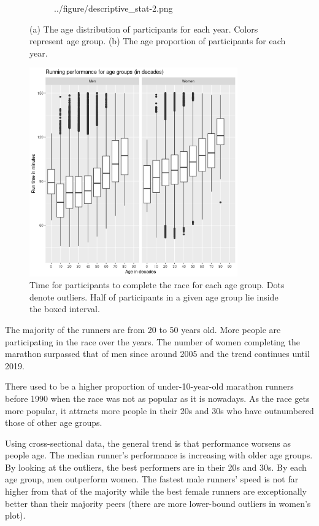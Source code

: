 \documentclass[12pt]{article}
\begin{document}
\begin{figure}
\begin{subfigure}{0.49\textwidth}
		{../figure/descriptive_stat-2.png}
		\caption{}
		\label{age-dist-2}
	\end{subfigure}
	\caption{
		(a) The age distribution of participants for each year.
		Colors represent age group.
		(b) The age proportion of participants for each year.
	}
	\label{age-dist}
\end{figure}

\begin{figure}[ht]
	\centering
	\includegraphics[width = 0.8\textwidth]
	{../figure/boxplot_runtime_age-1.png}
	\caption{
		Time for participants to complete the race for each age group.
		Dots denote outliers. Half of participants in a given age group
		lie inside the boxed interval.
	}
	\label{box-plot}
\end{figure}

The majority of the runners are from 20 to 50 years old.
More people are participating in the race over the years.
The number of women completing the marathon surpassed that of men since
around 2005 and the trend continues until 2019.

There used to be a higher proportion of under-10-year-old marathon
runners before 1990 when the race was not as popular as it is nowadays.
As the race gets more popular, it attracts more people in their 20s and 30s
who have outnumbered those of other age groups.

Using cross-sectional data, the general trend is that performance worsens as
people age. The median runner's performance is increasing with older age groups.
By looking at the outliers, the best performers are in their 20s and 30s.
By each age group, men outperform women.
The fastest male runners' speed is not far higher from that of the majority
while the best female runners are exceptionally better than their majority
peers (there are more lower-bound outliers in women's plot).
\end{document}
